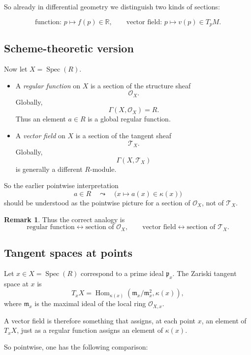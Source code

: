 \documentclass[11pt]{article}
\theoremstyle{definition}
\newtheorem{remark}[theorem]{Remark}
\newcommand{\Spec}{\operatorname{Spec}}
\newcommand{\kk}[1]{\kappa\!\left(#1\right)}
\begin{document}
So already in differential geometry we distinguish two kinds of sections:

\[
\text{function: }p\mapsto f(p)\in \mathbb{R},
\qquad
\text{vector field: }p\mapsto v(p)\in T_pM.
\]

\subsection{Scheme-theoretic version}

Now let \(X=\Spec(R)\).

\begin{itemize}
	\item A \emph{regular function} on \(X\) is a section of the structure sheaf
	\[
	\mathcal{O}_X.
	\]
	Globally,
	\[
	\Gamma(X,\mathcal O_X)=R.
	\]
	Thus an element \(a\in R\) is a global regular function.
	
	\item A \emph{vector field} on \(X\) is a section of the tangent sheaf
	\[
	\mathcal T_X.
	\]
	Globally,
	\[
	\Gamma(X,\mathcal T_X)
	\]
	is generally a different \(R\)-module.
\end{itemize}

So the earlier pointwise interpretation
\[
a\in R
\quad\leadsto\quad
\bigl(x\mapsto a(x)\in \kk{x}\bigr)
\]
should be understood as the pointwise picture for a section of \(\mathcal O_X\), not of \(\mathcal T_X\).

\begin{remark}
	Thus the correct analogy is
	\[
	\boxed{
		\text{regular function} \leftrightarrow \text{section of }\mathcal O_X,
		\qquad
		\text{vector field} \leftrightarrow \text{section of }\mathcal T_X.
	}
	\]
\end{remark}

\subsection{Tangent spaces at points}

Let \(x\in X=\Spec(R)\) correspond to a prime ideal \(\mathfrak p_x\).  
The Zariski tangent space at \(x\) is
\[
T_xX
=
\operatorname{Hom}_{\kk{x}}\!\left(\mathfrak m_x/\mathfrak m_x^2,\kk{x}\right),
\]
where \(\mathfrak m_x\) is the maximal ideal of the local ring \(\mathcal O_{X,x}\).

A vector field is therefore something that assigns, at each point \(x\), an element of \(T_xX\), just as a regular function assigns an element of \(\kk{x}\).

So pointwise, one has the following comparison:
\end{document}
